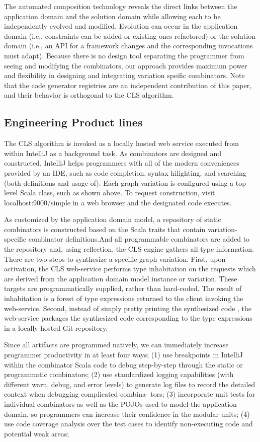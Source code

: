  The automated composition technology reveals the direct links between the application domain and the solution
 domain while allowing each to be independently evolved and modified. Evolution can occur in the application domain
 (i.e., constraints can be added or existing ones refactored) or the solution domain (i.e., an API for a framework
 changes and the corresponding invocations must adapt). Because there is no design tool separating the programmer
 from seeing and modifying the combinators, our approach provides maximum power and flexibility in designing and
 integrating variation speific combinators. Note that the code generator registries are an independent contribution
 of this paper, and their behavior is orthogonal to the CLS algorithm.

 \subsection{Engineering Product lines}

 The CLS algorithm is invoked as a locally hosted web service executed from within IntelliJ as a background task.
 As combinators are designed and constructed, IntelliJ helps programmers with all of the modern conveniences
 provided by an IDE, such as code completion, syntax hilighting, and searching (both definitions and usage of).
 Each graph variation is configured using a top-level Scala class, such as shown above.
 To request construction, visit localhost:9000/simple in a web browser and the designated code executes.

 As customized by the application domain model, a repository of static combinators is constructed
 based on the Scala traits that contain variation-specific combinator definitions.And all programmable combinators
 are added to the repository and, using reflection, the CLS engine gathers all type information.
 There are two steps to synthesize a specific graph variation. First, upon activation, the CLS web-service
 performs type inhabitation on the requests which are derived from the application domain model instance or variation.
  These targets are programmatically supplied, rather than hard-coded.
  The result of inhabitation is a forest of type expressions returned to
 the client invoking the web-service. Second, instead of simply pretty printing the synthesized code
 , the web-service packages the synthesized code corresponding to the type
 expressions in a locally-hosted Git repository.

 Since all artifacts are programmed natively, we can immediately increase programmer
 productivity in at least four ways; (1) use breakpoints in IntelliJ within the combinator Scala code to debug
 step-by-step through the static or programmatic combinators; (2) use standardized logging capabilities
 (with different warn, debug, and error levels) to generate log files to record the detailed context when debugging
 complicated combina- tors; (3) incorporate unit tests for individual combinators as well as the POJOs used to
 model the application domain, so programmers can increase their confidence in the modular units; (4) use code
 coverage analysis over the test cases to identify non-executing code and potential weak areas;

